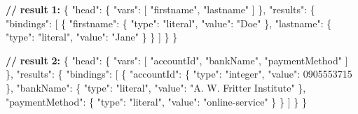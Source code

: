 \documentclass[12pt,english,a4paper,titlepage,cleardoublepage=empty,dottedtoc]{report}
\newenvironment{Shaded}{\begin{snugshade}}{\end{snugshade}}
\newcommand{\DataTypeTok}[1]{\textcolor[rgb]{0.13,0.29,0.53}{#1}}
\newcommand{\DecValTok}[1]{\textcolor[rgb]{0.00,0.00,0.81}{#1}}
\newcommand{\StringTok}[1]{\textcolor[rgb]{0.31,0.60,0.02}{#1}}
\newcommand{\OtherTok}[1]{\textcolor[rgb]{0.56,0.35,0.01}{#1}}
\newcommand{\FunctionTok}[1]{\textcolor[rgb]{0.00,0.00,0.00}{#1}}
\newcommand{\ErrorTok}[1]{\textcolor[rgb]{0.64,0.00,0.00}{\textbf{#1}}}
\begin{document}
\begin{Shaded}
\begin{Highlighting}[numbers=left,,]
\ErrorTok{//} \ErrorTok{result} \ErrorTok{1:}
\FunctionTok{\{}
    \DataTypeTok{"head"}\FunctionTok{:} \FunctionTok{\{}
        \DataTypeTok{"vars"}\FunctionTok{:} \OtherTok{[}
            \StringTok{"firstname"}\OtherTok{,}
            \StringTok{"lastname"}
        \OtherTok{]}
    \FunctionTok{\},}
    \DataTypeTok{"results"}\FunctionTok{:} \FunctionTok{\{}
        \DataTypeTok{"bindings"}\FunctionTok{:} \OtherTok{[}
            \FunctionTok{\{}
                \DataTypeTok{"firstname"}\FunctionTok{:} \FunctionTok{\{}
                    \DataTypeTok{"type"}\FunctionTok{:} \StringTok{"literal"}\FunctionTok{,}
                    \DataTypeTok{"value"}\FunctionTok{:} \StringTok{"Doe"}
                \FunctionTok{\},}
                \DataTypeTok{"lastname"}\FunctionTok{:} \FunctionTok{\{}
                    \DataTypeTok{"type"}\FunctionTok{:} \StringTok{"literal"}\FunctionTok{,}
                    \DataTypeTok{"value"}\FunctionTok{:} \StringTok{"Jane"}
                \FunctionTok{\}}
            \FunctionTok{\}}
        \OtherTok{]}
    \FunctionTok{\}}
\FunctionTok{\}}

\ErrorTok{//} \ErrorTok{result} \ErrorTok{2:}
\FunctionTok{\{}
    \DataTypeTok{"head"}\FunctionTok{:} \FunctionTok{\{}
        \DataTypeTok{"vars"}\FunctionTok{:} \OtherTok{[}
            \StringTok{"accountId"}\OtherTok{,}
            \StringTok{"bankName"}\OtherTok{,}
            \StringTok{"paymentMethod"}
        \OtherTok{]}
    \FunctionTok{\},}
    \DataTypeTok{"results"}\FunctionTok{:} \FunctionTok{\{}
        \DataTypeTok{"bindings"}\FunctionTok{:} \OtherTok{[}
            \FunctionTok{\{}
                \DataTypeTok{"accountId"}\FunctionTok{:} \FunctionTok{\{}
                    \DataTypeTok{"type"}\FunctionTok{:} \StringTok{"integer"}\FunctionTok{,}
                    \DataTypeTok{"value"}\FunctionTok{:} \DecValTok{0905553715}
                \FunctionTok{\},}
                \DataTypeTok{"bankName"}\FunctionTok{:} \FunctionTok{\{}
                    \DataTypeTok{"type"}\FunctionTok{:} \StringTok{"literal"}\FunctionTok{,}
                    \DataTypeTok{"value"}\FunctionTok{:} \StringTok{"A. W. Fritter Institute"}
                \FunctionTok{\},}
                \DataTypeTok{"paymentMethod"}\FunctionTok{:} \FunctionTok{\{}
                    \DataTypeTok{"type"}\FunctionTok{:} \StringTok{"literal"}\FunctionTok{,}
                    \DataTypeTok{"value"}\FunctionTok{:} \StringTok{"online-service"}
                \FunctionTok{\}}
            \FunctionTok{\}}
        \OtherTok{]}
    \FunctionTok{\}}
\FunctionTok{\}}
\end{Highlighting}
\end{Shaded}
\end{document}
